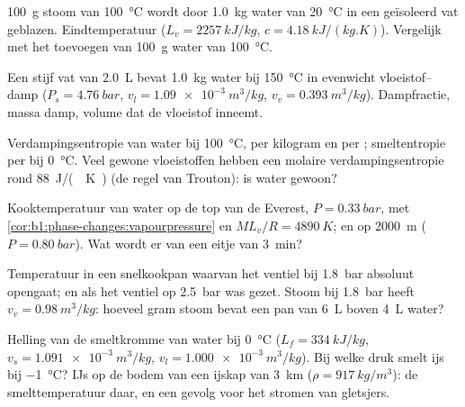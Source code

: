 \begin{exercise}[$\star$]\label{exo:b1:phase-changes:2}
\qty{100}{g} stoom van \qty{100}{\degreeCelsius} wordt door
\qty{1.0}{kg} water van \qty{20}{\degreeCelsius} in een geïsoleerd vat geblazen.
Eindtemperatuur ($L_v = \qty{2257}{kJ/kg}$, $c = \qty{4.18}{kJ/(kg.K)}$).
Vergelijk met het toevoegen van \qty{100}{g} water van \qty{100}{\degreeCelsius}.
\end{exercise}

\begin{exercise}[$\star$]\label{exo:b1:phase-changes:3}
Een stijf vat van \qty{2.0}{L} bevat \qty{1.0}{kg} water bij
\qty{150}{\degreeCelsius} in evenwicht vloeistof--damp ($P_s =
\qty{4.76}{bar}$, $v_l = \qty{1.09e-3}{m^3/kg}$, $v_v = \qty{0.393}{m^3/kg}$).
Dampfractie, massa damp, volume dat de vloeistof inneemt.
\end{exercise}

\begin{exercise}[$\star$]\label{exo:b1:phase-changes:4}
Verdampingsentropie van water bij \qty{100}{\degreeCelsius}, per kilogram
en per ; smeltentropie per  bij \qty{0}{\degreeCelsius}. Veel
gewone vloeistoffen hebben een molaire verdampingsentropie rond
\qty{88}{J/(.K)} (de regel van Trouton): is water gewoon?
\end{exercise}

\begin{exercise}[$\star\star$]\label{exo:b1:phase-changes:5}
Kooktemperatuur van water op de top van de Everest, $P =
\qty{0.33}{bar}$, met \cref{cor:b1:phase-changes:vapourpressure} en
$ML_v/R = \qty{4890}{K}$; en op \qty{2000}{m} ($P = \qty{0.80}{bar}$). Wat
wordt er van een eitje van \qty{3}{min}?
\end{exercise}

\begin{exercise}[$\star\star$]\label{exo:b1:phase-changes:6}
Temperatuur in een snelkookpan waarvan het ventiel bij \qty{1.8}{bar}
absoluut opengaat; en als het ventiel op \qty{2.5}{bar} was gezet. Stoom bij
\qty{1.8}{bar} heeft $v_v = \qty{0.98}{m^3/kg}$: hoeveel gram stoom bevat
een pan van \qty{6}{L} boven \qty{4}{L} water?
\end{exercise}

\begin{exercise}[$\star\star$]\label{exo:b1:phase-changes:7}
Helling van de smeltkromme van water bij \qty{0}{\degreeCelsius} ($L_f =
\qty{334}{kJ/kg}$, $v_s = \qty{1.091e-3}{m^3/kg}$, $v_l = \qty{1.000e-3}{m^3/kg}$).
Bij welke druk smelt ijs bij \qty{-1}{\degreeCelsius}? IJs op de
bodem van een ijskap van \qty{3}{km} ($\rho = \qty{917}{kg/m^3}$): de
smelttemperatuur daar, en een gevolg voor het stromen van gletsjers.
\end{exercise}

